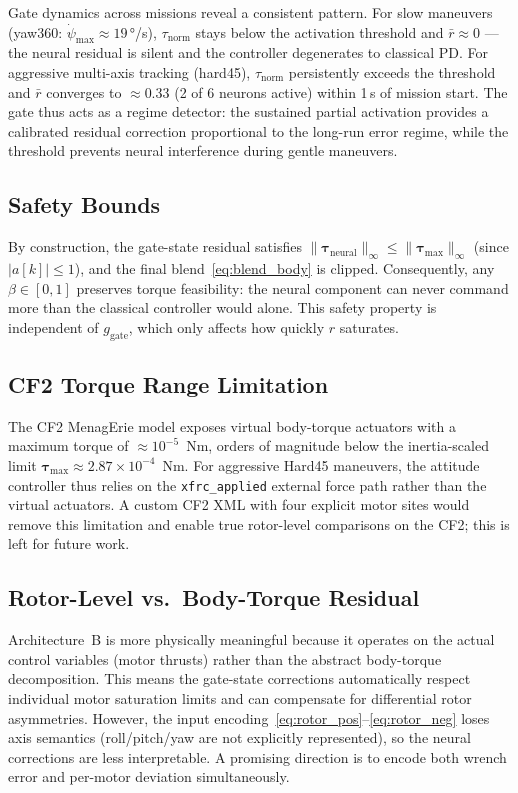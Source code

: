 \documentclass[conference]{IEEEtran}
\begin{document}
Gate dynamics across missions reveal a consistent pattern.
For slow maneuvers (yaw360: $\dot{\psi}_\text{max}{\approx}19$\,°/s),
$\tau_\mathrm{norm}$ stays below the activation threshold and
$\bar{r}{\approx}0$ — the neural residual is silent and the controller
degenerates to classical PD.
For aggressive multi-axis tracking (hard45), $\tau_\mathrm{norm}$
persistently exceeds the threshold and $\bar{r}$ converges to
${\approx}0.33$ (2 of 6 neurons active) within 1\,s of mission start.
The gate thus acts as a regime detector: the sustained partial activation
provides a calibrated residual correction proportional to the long-run
error regime, while the threshold prevents neural interference during
gentle maneuvers.

\subsection{Safety Bounds}

By construction, the gate-state residual satisfies
$\|\boldsymbol{\tau}_{\mathrm{neural}}\|_\infty \le \|\boldsymbol{\tau}_{\max}\|_\infty$
(since $|a[k]| \le 1$), and the final blend~\eqref{eq:blend_body} is clipped.
Consequently, any $\beta \in [0,1]$ preserves torque feasibility: the neural
component can never command more than the classical controller would alone.
This safety property is independent of $g_{\mathrm{gate}}$, which only affects
how quickly $r$ saturates.

\subsection{CF2 Torque Range Limitation}

The CF2 MenagErie model exposes virtual body-torque actuators with a maximum
torque of $\approx 10^{-5}$~Nm, orders of magnitude below the
inertia-scaled limit $\boldsymbol{\tau}_{\max} \approx 2.87 \times 10^{-4}$~Nm.
For aggressive Hard45 maneuvers, the attitude controller thus relies on the
\texttt{xfrc\_applied} external force path rather than the virtual actuators.
A custom CF2 XML with four explicit motor sites would remove this limitation
and enable true rotor-level comparisons on the CF2; this is left for future
work.

\subsection{Rotor-Level vs.\ Body-Torque Residual}

Architecture~B is more physically meaningful because it operates on the
actual control variables (motor thrusts) rather than the abstract body-torque
decomposition.
This means the gate-state corrections automatically respect individual motor
saturation limits and can compensate for differential rotor asymmetries.
However, the input encoding~\eqref{eq:rotor_pos}--\eqref{eq:rotor_neg}
loses axis semantics (roll/pitch/yaw are not explicitly represented), so the
neural corrections are less interpretable.
A promising direction is to encode both wrench error and per-motor deviation
simultaneously.
\end{document}
